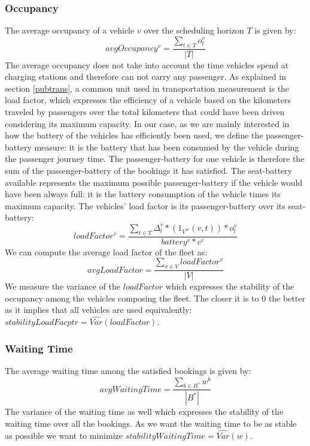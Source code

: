 \documentclass[12pt,a4paper]{article}
\begin{document}
\subsubsection*{Occupancy}
The average occupancy of a vehicle $v$ over the scheduling horizon $T$ is given by:
$$avgOccupancy^{v} = \frac{\sum_{t \in T}o^{v}_{t}}{|T|}$$
The average occupancy does not take into account the time vehicles spend at charging stations and therefore can not carry any passenger. As explained in section \ref{pubtrans}, a common unit used in transportation  measurement is the load factor, which expresses the efficiency of a vehicle based on the kilometers traveled by passengers over the total kilometers that could have been driven considering its maximum capacity. In our case, as we are mainly interested in how the battery of the vehicles has efficiently been used, we define the passenger-battery measure: it is the battery that has been consumed by the vehicle during the passenger journey time. The passenger-battery for one vehicle is therefore the sum of the passenger-battery of the bookings it has satisfied. The seat-battery available represents the maximum possible passenger-battery if the vehicle would have been always full: it is the battery consumption of the vehicle times its maximum capacity. The vehicles' load factor is its passenger-battery over its seat-battery:
$$loadFactor^{v} = \frac{\sum_{t \in T} \Delta^{v}_{t} * (1_{V^{\#}}(v,t)) * o^{v}_{t}}{battery^{v} * c^{v}}$$
We can compute the average load factor of the fleet as:
$$avgLoadFactor = \frac{\sum_{v \in V}loadFactor^{v}}{|V|}$$
We measure the variance of the $loadFactor$ which expresses the stability of the occupancy among the vehicles composing the fleet. The closer it is to 0 the better as it implies that all vehicles are used equivalently: $stabilityLoadFacptr = \widehat{Var}(loadFactor)$.
\subsubsection*{Waiting Time}
The average waiting time among the satisfied bookings is given by: 
$$avgWaitingTime = \frac{\sum_{b \in B^{*}}w^{b}}{|B^{*}|} $$
The variance of the waiting time as well which expresses the stability of the waiting time over all the bookings. As we want the waiting time to be as stable as possible we want to minimize $stabilityWaitingTime = \widehat{Var}(w)$.
\end{document}
